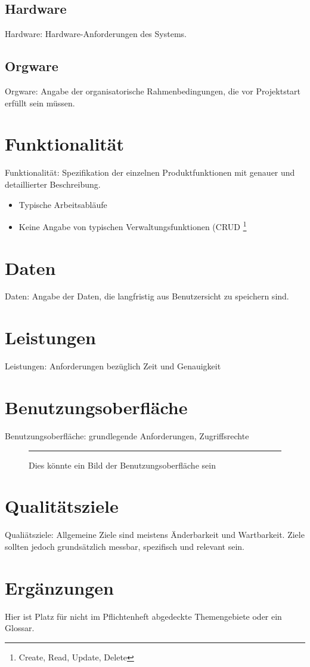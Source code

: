 \documentclass[a4paper]{scrreprt}
\begin{document}
\section{Hardware}
Hardware: Hardware-Anforderungen des Systems.
 
\section{Orgware}
Orgware: Angabe der organisatorische Rahmenbedingungen, die vor Projektstart
erfüllt sein müssen.
 
\chapter{Funktionalität}
Funktionalität: Spezifikation der einzelnen Produktfunktionen mit genauer und
detaillierter Beschreibung.
 
\begin{itemize}
  \item Typische Arbeitsabläufe
  \item Keine Angabe von typischen Verwaltungsfunktionen (CRUD \footnote{Create,
Read, Update, Delete}
\end{itemize}
 
\chapter{Daten}
Daten: Angabe der Daten, die langfristig aus Benutzersicht zu speichern sind.
 
\chapter{Leistungen}
Leistungen: Anforderungen bezüglich Zeit und Genauigkeit
 
\chapter{Benutzungsoberfläche}
Benutzungsoberfläche: grundlegende Anforderungen, Zugriffsrechte
 
\begin{figure}[ht]
  \centering
  \rule{8cm}{6cm}
  \caption{Dies könnte ein Bild der Benutzungsoberfläche sein}
\end{figure}
 
\chapter{Qualitätsziele}
Qualiätsziele: Allgemeine Ziele sind meistens Änderbarkeit und Wartbarkeit.
Ziele sollten jedoch grundsätzlich messbar, spezifisch und relevant sein.
 
\chapter{Ergänzungen}
Hier ist Platz für nicht im Pflichtenheft abgedeckte Themengebiete oder ein
Glossar.
 
\listoffigures
 
\end{document}
